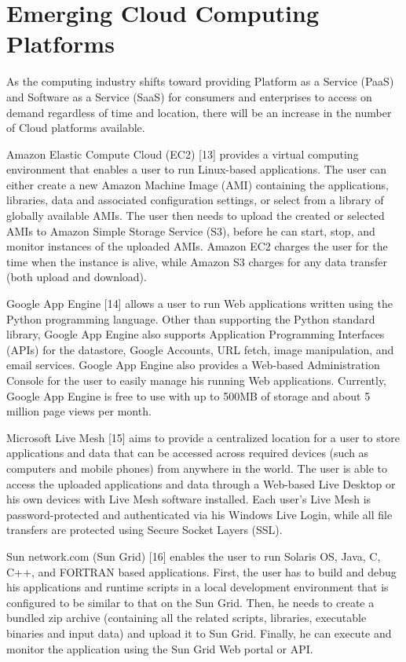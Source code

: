 \documentclass[conference, compsoc]{IEEEtran}
\begin{document}
\vspace{.3cm}
\section{Emerging Cloud Computing Platforms}

As the computing industry shifts toward providing Platform as a Service (PaaS) and Software as a Service (SaaS) for consumers and enterprises to access on demand regardless of time and location, there will be an increase in the number of Cloud platforms available.

Amazon Elastic Compute Cloud (EC2) [13] provides a virtual computing environment that enables a user to run Linux-based applications. The user can either create a new Amazon Machine Image (AMI) containing the applications, libraries, data and associated configuration settings, or select from a library of globally available AMIs. The user then needs to upload the created or selected AMIs to Amazon Simple Storage Service (S3), before he can start, stop, and monitor instances of the uploaded AMIs. Amazon EC2 charges the user for the time when the instance is alive, while Amazon S3 charges for any data transfer (both upload and download).

Google App Engine [14] allows a user to run Web applications written using the Python programming language. Other than supporting the Python standard  library, Google App Engine also supports Application Programming Interfaces (APIs) for the datastore, Google Accounts, URL fetch, image manipulation, and email services. Google App Engine also provides a Web-based Administration Console for the user to easily manage his running Web applications. Currently, Google App Engine is free to use with up to 500MB of storage and about 5 million page views per month.

Microsoft Live Mesh [15] aims to provide a centralized location for a user to store applications and data that can be accessed across required devices (such as computers and mobile phones) from anywhere in the world. The user is able to access the uploaded applications and data through a Web-based Live Desktop or his own devices with Live Mesh software installed. Each user’s Live Mesh is password-protected and authenticated via his Windows Live Login, while all file transfers are protected using Secure Socket Layers (SSL).

Sun network.com (Sun Grid) [16] enables the user to run Solaris OS, Java, C, C++, and FORTRAN based applications. First, the user has to build and debug his applications and runtime scripts in a local development environment that is configured to be similar to that on the Sun Grid. Then, he needs to create a bundled zip archive (containing all the related scripts, libraries, executable binaries and input data) and upload it to Sun Grid. Finally, he can execute and monitor the application using the Sun Grid Web portal or API.
\end{document}
